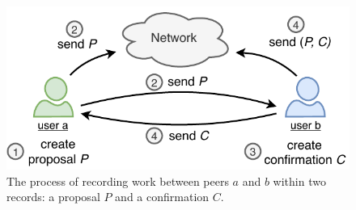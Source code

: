 
\begin{figure}[t]
	\centering
	\includegraphics[width=.75\linewidth]{trustchain/assets/interaction}
	\caption{The process of recording work between peers $ a $ and $ b $ within two records: a proposal $ P $ and a confirmation $ C $.}
	\label{fig:interaction}
\end{figure}


